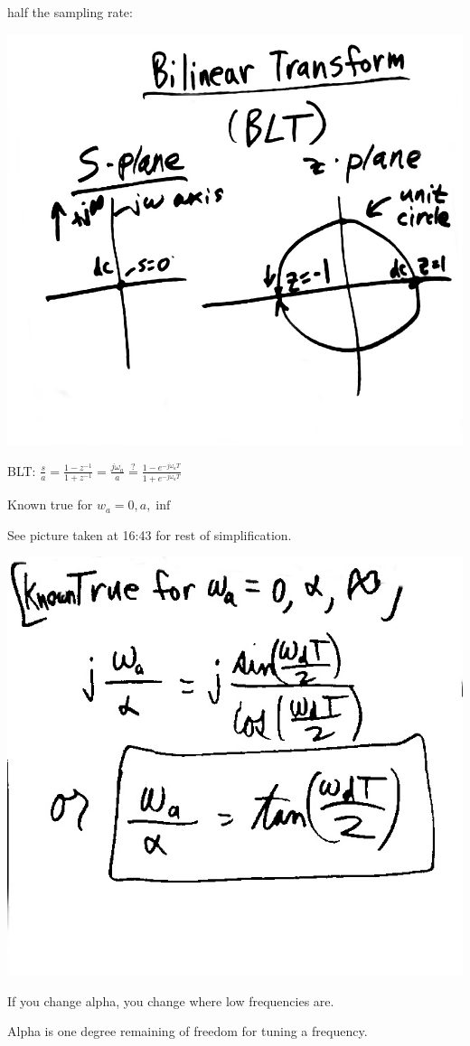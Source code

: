 half the sampling rate: 

\includegraphics[scale=0.25]{photos/jan17/9g}

BLT: $\frac{s}{a} = \frac{1 - z^{-1}}{1 + z^{-1}}
= \frac{j\omega_a}{a} \stackrel{?}{=}
\frac{1 - e^{-j \omega_a T}}{1 + e^{-j \omega_a T}}$

Known true for $w_a = 0, a, \inf$

See picture taken at 16:43 for rest of simplification.

\includegraphics[scale=0.25]{photos/jan17/9h}



If you change alpha, you change where low frequencies are. 

Alpha is one degree remaining of freedom for tuning a frequency. 

